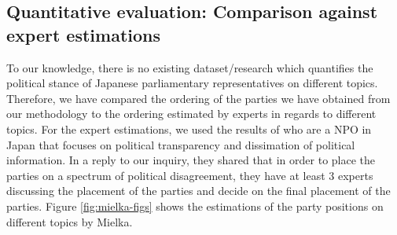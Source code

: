 \documentclass[final,5p,times,twocolumn,authoryear]{elsarticle}
\begin{document}
\subsection{Quantitative evaluation: Comparison against expert estimations}
To our knowledge, there is no existing dataset/research which quantifies the political stance of Japanese parliamentary representatives on different topics. Therefore, we have compared the ordering of the parties we have obtained from our methodology to the ordering estimated by experts in regards to different topics. For the expert estimations, we used the results of \citeauthor{Mielka} who are a NPO in Japan that focuses on political transparency and dissimation of political information. In a reply to our inquiry, they shared that in order to place the parties on a spectrum of political disagreement, they have at least 3 experts discussing the placement of the parties and decide on the final placement of the parties. Figure \ref{fig:mielka-figs} shows the estimations of the party positions on different topics by Mielka.
\end{document}
